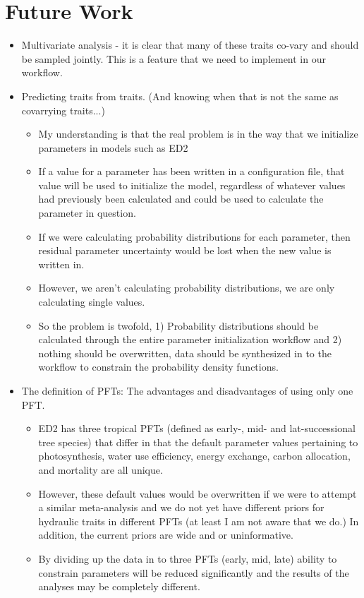 \section*{Future Work}

\begin{itemize}
    \item Multivariate analysis - it is clear that many of these traits co-vary and should be sampled jointly. This is a feature that we need to implement in our workflow. 
    
    \item Predicting traits from traits. (And knowing when that is not the same as covarrying traits...)
        \begin{itemize}
            \item My understanding is that the real problem is in the way that we initialize parameters in models such as ED2
            \item If a value for a parameter has been written in a configuration file, that value will be used to initialize the model, regardless of whatever values had previously been calculated and could be used to calculate the parameter in question. 
            \item If we were calculating probability distributions for each parameter, then residual parameter uncertainty would be lost when the new value is written in.
            \item However, we aren't calculating probability distributions, we are only calculating single values. 
            \item So the problem is twofold, 1) Probability distributions should be calculated through the entire parameter initialization workflow and 2) nothing should be overwritten, data should be synthesized in to the workflow to constrain the probability density functions. 
        \end{itemize}
        
    \item The definition of PFTs: The advantages and disadvantages of using only one PFT.
        \begin{itemize}
            \item ED2 has three tropical PFTs (defined as early-, mid- and lat-successional tree species) that differ in that the default parameter values pertaining to photosynthesis, water use efficiency, energy exchange, carbon allocation, and mortality are all unique. 
            \item However, these default values would be overwritten if we were to attempt a similar meta-analysis and we do not yet have different priors for hydraulic traits in different PFTs (at least I am not aware that we do.) In addition, the current priors are wide and or uninformative. 
            \item By dividing up the data in to three PFTs (early, mid, late) ability to constrain parameters will be reduced significantly and the results of the analyses may be completely different. 
        \end{itemize}
        

\end{itemize}
